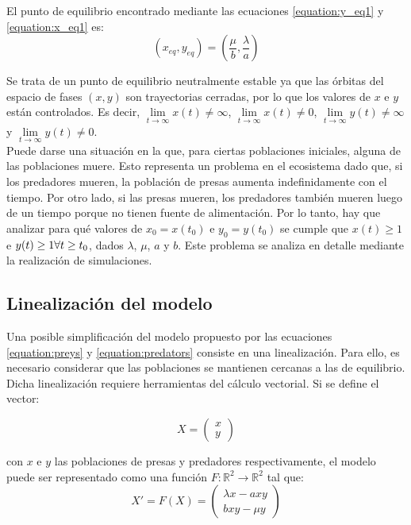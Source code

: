 \documentclass[journal, monochrome]{IEEEtran}
\begin{document}
El punto de equilibrio encontrado mediante las ecuaciones \ref{equation:y_eq1} y 
\ref{equation:x_eq1} es:
\begin{equation}
(x_{eq}, y_{eq}) = \left(\frac{\mu}{b}, \frac{\lambda}{a}\right)
\label{equation:eq1}
\end{equation}

Se trata de un punto de equilibrio neutralmente estable ya que las órbitas del espacio de fases $(x, y)$ son trayectorias cerradas, por lo que los valores de
$x$ e $y$ están controlados. Es decir, $\lim\limits_{t\rightarrow\infty} x(t) \neq \infty$,  $\lim\limits_{t\rightarrow\infty} x(t) \neq 0$, $\lim\limits_{t\rightarrow\infty} y(t) \neq \infty$ y $\lim\limits_{t\rightarrow\infty} y(t) \neq 0$.\\

Puede darse una situación en la que, para ciertas poblaciones iniciales, alguna de las poblaciones muere. Esto representa un 
problema en el ecosistema dado que, si los predadores mueren, la población de presas aumenta indefinidamente con el tiempo. 
Por otro lado, si las presas mueren, los predadores también mueren luego de un tiempo porque no tienen fuente de alimentación. 
Por lo tanto, hay que analizar para qué valores de $x_{0} = x(t_{0})$ e $y_{0} = y(t_{0})$ se cumple que $x(t) \geq 1$ e $y(t) \geq 1 \\ \forall t \geq t_{0}$, dados $\lambda$, $\mu$, $a$ y $b$.
Este problema se analiza en detalle mediante la realización de simulaciones.

\subsection{Linealización del modelo}
Una posible simplificación del modelo propuesto por las ecuaciones \ref{equation:preys} y \ref{equation:predators} consiste en una linealización. Para ello, es necesario considerar que las poblaciones se mantienen cercanas a las de equilibrio. Dicha linealización requiere herramientas del cálculo vectorial. Si se define el vector:

\begin{equation}
X = \left(\begin{array}{c}
x \\
y \end{array} \right)
\label{equation:vectorDefinition}
\end{equation}

con $x$ e $y$ las poblaciones de presas y predadores respectivamente, el modelo puede ser representado como una función $ F:\mathds{R}^{2} \rightarrow \mathds{R}^{2}$ tal que:
\begin{equation}
X' = F(X) = \left(\begin{array}{c}
\lambda x - axy \\
bxy - \mu y \end{array} \right)
\label{equation:systemFunctionDefinition}
\end{equation}
\end{document}
